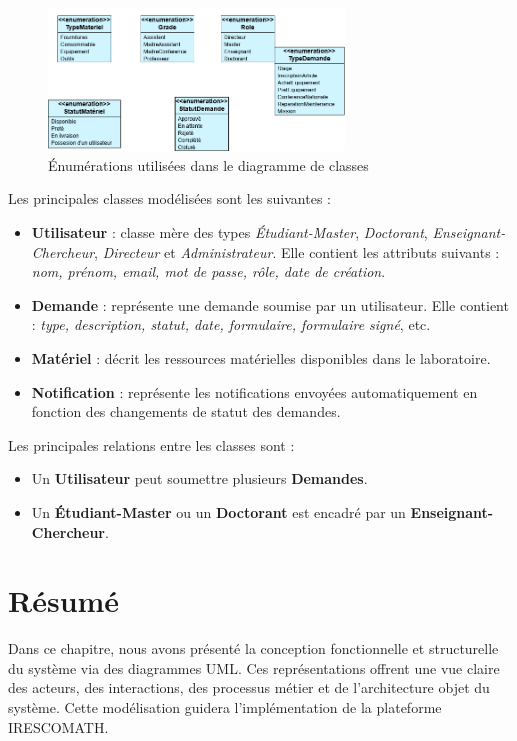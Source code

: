 \begin{figure}[H]
    \centering
    \includegraphics[width=0.7\textwidth]{images/diagramme_de_classe/enums.png}
    \caption{Énumérations utilisées dans le diagramme de classes}
    \label{fig:enum_class}
\end{figure}

Les principales classes modélisées sont les suivantes :

\begin{itemize}
    \item \textbf{Utilisateur} : classe mère des types \textit{Étudiant-Master}, \textit{Doctorant}, \textit{Enseignant-Chercheur}, \textit{Directeur} et \textit{Administrateur}. Elle contient les attributs suivants : \textit{nom, prénom, email, mot de passe, rôle, date de création}.
    
    \item \textbf{Demande} : représente une demande soumise par un utilisateur. Elle contient : \textit{type, description, statut, date, formulaire, formulaire signé}, etc.
    
    \item \textbf{Matériel} : décrit les ressources matérielles disponibles dans le laboratoire.
    
    \item \textbf{Notification} : représente les notifications envoyées automatiquement en fonction des changements de statut des demandes.
\end{itemize}

Les principales relations entre les classes sont :

\begin{itemize}
    \item Un \textbf{Utilisateur} peut soumettre plusieurs \textbf{Demandes}.
    
    \item Un \textbf{Étudiant-Master} ou un \textbf{Doctorant} est encadré par un \textbf{Enseignant-Chercheur}.
\end{itemize}

\section{Résumé}

Dans ce chapitre, nous avons présenté la conception fonctionnelle et structurelle du système via des diagrammes UML. Ces représentations offrent une vue claire des acteurs, des interactions, des processus métier et de l'architecture objet du système. Cette modélisation guidera l'implémentation de la plateforme IRESCOMATH.